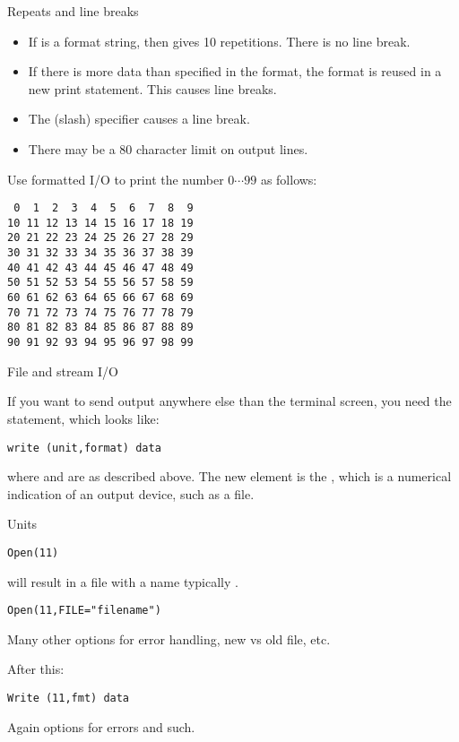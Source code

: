 \begin{block}{Repeats and line breaks}
  \label{sl:formatrepeat}
  \begin{itemize}
  \item If  is a format string, then  gives 10
    repetitions. There is no line break.
  \item If there is more data than specified in the format, the format
    is reused in a new print statement. This causes line breaks.
  \item The \n{/} (slash) specifier causes a line break.
  \item There may be a 80 character limit on output lines.
  \end{itemize}
\end{block}

\begin{exercise}
  \label{ex:f99}
  Use formatted I/O to print the number $0\cdots99$ as follows:
\begin{verbatim}
 0  1  2  3  4  5  6  7  8  9
10 11 12 13 14 15 16 17 18 19
20 21 22 23 24 25 26 27 28 29
30 31 32 33 34 35 36 37 38 39
40 41 42 43 44 45 46 47 48 49
50 51 52 53 54 55 56 57 58 59
60 61 62 63 64 65 66 67 68 69
70 71 72 73 74 75 76 77 78 79
80 81 82 83 84 85 86 87 88 89
90 91 92 93 94 95 96 97 98 99
\end{verbatim}
\end{exercise}

 {File and stream I/O}

If you want to send output anywhere else than the terminal screen, you
need the  statement, which looks like:
\begin{verbatim}
write (unit,format) data
\end{verbatim}
where  and  are as described above. The new element
is the , which is a numerical indication of an output
device, such as a file.

 {Units}

\begin{verbatim}
Open(11)
\end{verbatim}
will result in a file with a name typically .
\begin{verbatim}
Open(11,FILE="filename")
\end{verbatim}
Many other options for error handling, new vs old file, etc.

After this:
\begin{verbatim}
Write (11,fmt) data
\end{verbatim}
Again options for errors and such.

